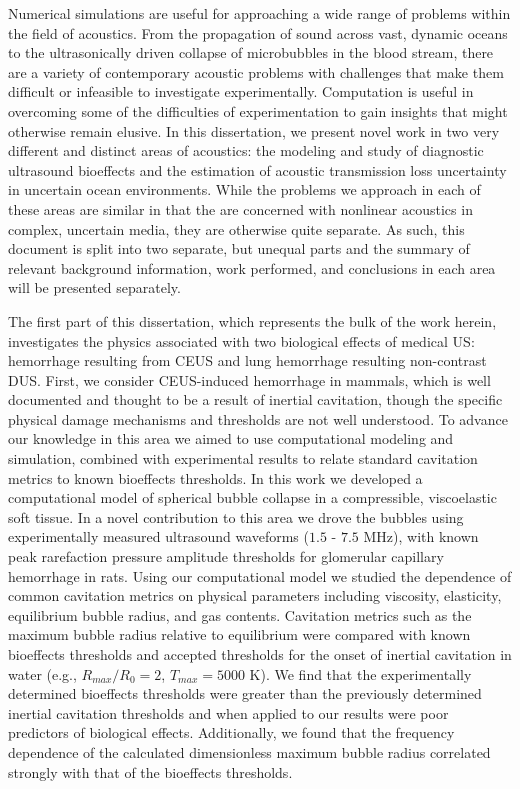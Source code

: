 \acresetall%
\setlength\parindent{20pt}%
Numerical simulations are useful for approaching a wide range of
problems within the field of acoustics. From the propagation of sound
across vast, dynamic oceans to the ultrasonically driven collapse of
microbubbles in the blood stream, there are a variety of contemporary
acoustic problems with challenges that make them difficult or
infeasible to investigate experimentally. Computation is useful in
overcoming some of the difficulties of experimentation to gain
insights that might otherwise remain elusive. In this dissertation, we
present novel work in two very different and distinct areas of
acoustics: the modeling and study of diagnostic ultrasound bioeffects
and the estimation of acoustic transmission loss uncertainty in
uncertain ocean environments. While the problems we approach in each
of these areas are similar in that the are concerned with nonlinear
acoustics in complex, uncertain media, they are otherwise quite
separate. As such, this document is split into two separate, but
unequal parts and the summary of relevant background information, work
performed, and conclusions in each area will be presented separately.

The first part of this dissertation, which represents the bulk of the
work herein, investigates the physics associated with two biological
effects of medical \ac{US}: hemorrhage resulting from \ac{CEUS} and
lung hemorrhage resulting non-contrast \ac{DUS}. First, we consider
\ac{CEUS}-induced hemorrhage in mammals, which is well documented and
thought to be a result of inertial cavitation, though the specific
physical damage mechanisms and thresholds are not well understood. To
advance our knowledge in this area we aimed to use computational
modeling and simulation, combined with experimental results to relate
standard cavitation metrics to known bioeffects thresholds. In this
work we developed a computational model of spherical bubble collapse
in a compressible, viscoelastic soft tissue. In a novel contribution
to this area we drove the bubbles using experimentally measured
ultrasound waveforms ($1.5$ - $7.5$ MHz), with known peak rarefaction
pressure amplitude thresholds for glomerular capillary hemorrhage in
rats. Using our computational model we studied the dependence of
common cavitation metrics on physical parameters including viscosity,
elasticity, equilibrium bubble radius, and gas contents. Cavitation
metrics such as the maximum bubble radius relative to equilibrium were
compared with known bioeffects thresholds and accepted thresholds for
the onset of inertial cavitation in water (e.g., $R_{max}/R_0=2$,
$T_{max}=5000$ K). We find that the experimentally determined
bioeffects thresholds were greater than the previously determined
inertial cavitation thresholds and when applied to our results were
poor predictors of biological effects. Additionally, we found that the
frequency dependence of the calculated dimensionless maximum bubble
radius correlated strongly with that of the bioeffects thresholds.

